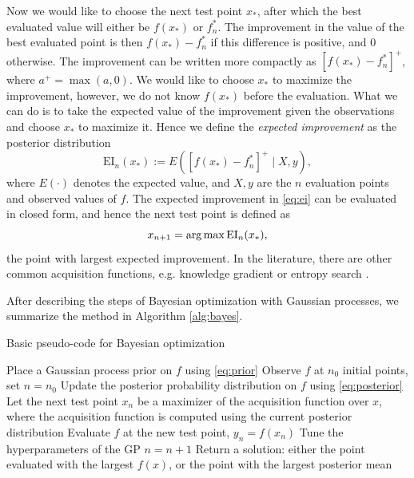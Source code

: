 Now we would like to choose the next test point $x_*$, after which the best evaluated value will either be $f(x_*)$ or $f_n^*$. The improvement in the value of the best evaluated point is then $f(x_*)-f_n^*$ if this difference is positive, and 0 otherwise. The improvement can be written more compactly as $[f(x_*)-f_n^*]^+$, where $a^+=\max(a,0)$. We would like to choose $x_*$ to maximize the improvement, however, we do not know $f(x_*)$ before the evaluation. What we can do is to take the expected value of the improvement given the observations and choose $x_*$ to maximize it. Hence we define the \textit{expected improvement} as the posterior distribution
\begin{equation}\label{eq:ei}
    \mathrm{EI}_n(x_*):=E\left([f(x_*)-f_n^*]^+ \mid X,y\right),
\end{equation}
where $E(\cdot)$ denotes the expected value, and $X,y$ are the $n$ evaluation points and observed values of $f$. The expected improvement in \eqref{eq:ei} can be evaluated in closed form, and hence the next test point is defined as
\begin{equation}
    x_{n+1} = \operatorname*{arg\,max}\mathrm{EI}_n(x_*),
\end{equation}
the point with largest expected improvement. In the literature, there are other common acquisition functions, e.g. knowledge gradient or entropy search \cite{frazier2018tutorial}.

After describing the steps of Bayesian optimization with Gaussian processes, we summarize the method in Algorithm \ref{alg:bayes}.
\begin{algorithm}
\caption{Basic pseudo-code for Bayesian optimization \cite{frazier2018tutorial}}
\label{alg:bayes}
\begin{algorithmic}[1]
	\State Place a Gaussian process prior on $f$ using \eqref{eq:prior}
    \State Observe $f$ at $n_0$ initial points, set $n=n_0$
    \State Update the posterior probability distribution on $f$ using \eqref{eq:posterior}
    \State Let the next test point $x_n$ be a maximizer of the acquisition function over $x$, where the acquisition function is computed using the current posterior distribution
    \State Evaluate $f$ at the new test point, $y_n = f(x_n)$
    \State Tune the hyperparameters of the GP
    \State $n=n+1$
	\EndWhile
	\State Return a solution: either the point evaluated with the largest $f(x)$, or the point with the largest posterior mean
\end{algorithmic}
\end{algorithm}


